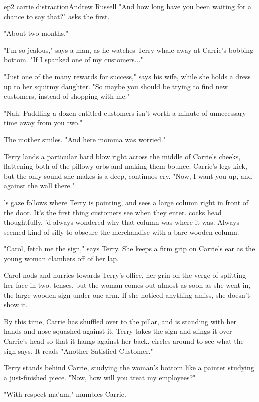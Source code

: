 \documentclass{book}
\begin{document}
\begin{childnode}{ep2 carrie distraction}{Andrew Russell}
    "And how long have you been waiting for a chance to say that?" asks the first.

    "About two months."

    "I'm so jealous," says a man, as he watches Terry whale away at Carrie's bobbing bottom. "If I spanked one of my customers..."

    "Just one of the many rewards for success," says his wife, while she holds a dress up to her squirmy daughter. "So maybe you should be trying to find new customers, instead of shopping with me."

    "Nah. Paddling a dozen entitled customers isn't worth a minute of unnecessary time away from you two."

    The mother smiles. "And here momma was worried."

    Terry lands a particular hard blow right across the middle of Carrie's cheeks, flattening both of the pillowy orbs and making them bounce. Carrie's legs kick, but the only sound she makes is a 
    deep, continuos cry. 
    "Now, I want you up, and against the wall there."

    \name{}'s gaze follows where Terry is pointing, and sees a large column right in front of the door. It's the first thing customers see when they enter. \name{} cocks \hisher{}
    head thoughtfully. \HeShe{}'d always wondered why that column was where it was. Always seemed kind of silly to obscure the merchandise with a bare wooden column.

    "Carol, fetch me the sign," says Terry. She keeps a firm grip on Carrie's ear as the young woman clambers off of her lap.

    Carol nods and hurries towards Terry's office, her grin on the verge of splitting her face in two. \name{} tenses, but the woman comes out almost as soon as she went in, the large wooden
    sign under one arm. If she noticed anything amiss, she doesn't show it.

    By this time, Carrie has shuffled over to the pillar, and is standing with her hands and nose squashed against it. Terry takes the sign and slings it over Carrie's head so that it hangs
    against her back. \name{} circles around to see what the sign says. It reads "Another Satisfied Customer."

    Terry stands behind Carrie, studying the woman's bottom like a painter studying a just-finished piece. "Now, how will you treat my employees?"

    "With respect ma'am," mumbles Carrie.


\end{childnode}
\end{document}

